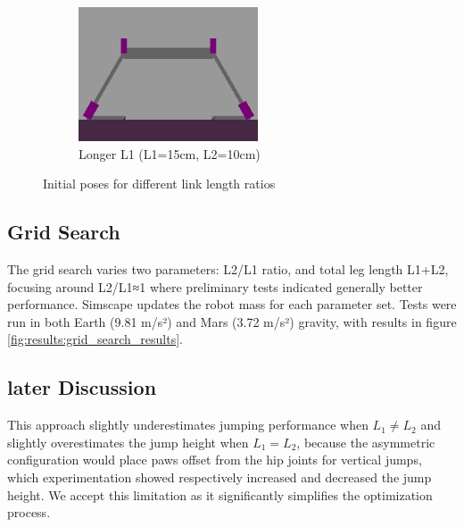 \begin{figure}[h]
\begin{subfigure}[b]{0.32\textwidth}
        \centering
        \includegraphics[width=\textwidth]{Images/link_length_optimization/longer_L1_pose.png}
        \caption{Longer L1 (L1=15cm, L2=10cm)}
    \end{subfigure}
    \caption{Initial poses for different link length ratios}
    \label{fig:link_length_optimization:initial_poses}
\end{figure}



\subsection{Grid Search}
The grid search varies two parameters: L2/L1 ratio, and total leg length L1+L2, focusing around L2/L1≈1 where preliminary tests indicated generally better performance. Simscape updates the robot mass for each parameter set. Tests were run in both Earth (9.81 m/s²) and Mars (3.72 m/s²) gravity, with results in figure \ref{fig:results:grid_search_results}.


\subsection{later Discussion}
This approach slightly underestimates jumping performance when \(L_1 \neq L_2\) and slightly overestimates the jump height when \(L_1 = L_2\), because the asymmetric configuration would place paws offset from the hip joints for vertical jumps, which experimentation showed respectively increased and decreased the jump height. We accept this limitation as it significantly simplifies the optimization process.
